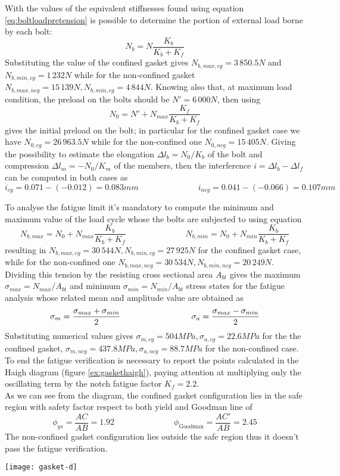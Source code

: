 	With the values of the equivalent stiffnesses  found using equation \ref{eq:boltloadpretension} is possible to determine the portion of external load borne by each bolt:
	\[ N_b = N \frac{K_b}{K_b + K_f} \]
	Substituting the value of the confined gasket gives $N_{b,max,cg} = 3\,850.5N$ and $N_{b,min,cg} = 1\,232N$ while for the non-confined gasket $N_{b,max,ncg} = 15\, 139 N,N_{b,min,cg} = 4\,844N$. Knowing also that, at maximum load condition, the preload on the bolts should be $N' = 6\,000N$, then using 
	\[ N_0 = N' + N_{max} \frac{K_f}{K_b+K_f} \]
	gives the initial preload on the bolt; in particular for the confined gasket case we have $N_{0,cg} = 26\,963.5N$ while for the non-confined one $N_{0,ncg} = 15\,405 N $. Giving the possibility to estimate the elongation $\Delta l_b = N_0/ K_b$ of the bolt and compression $\Delta l_m = - N_0/K_m$ of the members,  then the interference $i = \Delta l_b - \Delta l_f$ can be computed in both cases as
	\[ i_{cg} = 0.071 - (-0.012) = 0.083mm \hspace{3cm} i_{ncg} = 0.041 - (-0.066) = 0.107mm \]
	
	To analyse the fatigue limit it's mandatory to compute the minimum and maximum value of the load cycle whose the bolts are subjected to using equation
	\[ N_{b,max} = N_0 + N_{max} \frac{K_b}{K_b + K_f} \hspace{3cm} N_{b,min} = N_0 + N_{min} \frac{K_b}{K_b + K_f} \]
	resulting in $N_{b,max,cg} = 30\,544N, N_{b,min,cg} = 27\,925N$ for the confined gasket case, while for the non-confined one $N_{b,max,ncg} = 30\,534N, N_{b,min,ncg} = 20\,249N$. Dividing this tension by the  resisting cross sectional area $A_{bt}$ gives the maximum $\sigma_{max} = N_{max}/A_{bt}$ and minimum $\sigma_{min} = N_{min}/A_{bt}$ stress states for the fatigue analysis whose related mean and amplitude value are obtained as
	\[ \sm = \frac{\sigma_{max}+\sigma_{min}}{2} \hspace{3cm} \sa= \frac{\sigma_{max}-\sigma_{min}}{2} \]
	Substituting numerical values gives $\sigma_{m,cg} = 504 MPa, \sigma_{a,cg} = 22.6
	MPa$ for the the confined gasket, $\sigma_{m,ncg} = 437.8 MPa, \sigma_{a,ncg} = 88.7 MPa$ for the non-confined case. To end the fatigue verification is necessary to report the points calculated in the Haigh diagram (figure \ref{ex:gaskethaigh}), paying attention at multiplying only the oscillating term by the notch fatigue factor $K_f = 2.2$. \\	
	As we can see from the diagram, the confined gasket configuration lies in the safe region with safety factor respect to both yield and Goodman line of
	\[ \phi_{ys} = \frac{AC}{AB} = 1.92 \hspace{3cm} \phi_\textrm{Goodman} = \frac{AC'}{AB} = 2.45 \]
	The non-confined gasket configuration lies outside the safe region thus it doesn't pass the fatigue verification.
	
	\begin{SCfigure}[1][b]
		\centering \texttt{[image: gasket-d]}
		\caption{Haigh diagram for the confined gasket case and the non-confined one.} \label{ex:gaskethaigh}
	\end{SCfigure}
	
	
	
	
	
	
	
	
	
	
	
	
	
	
	
	